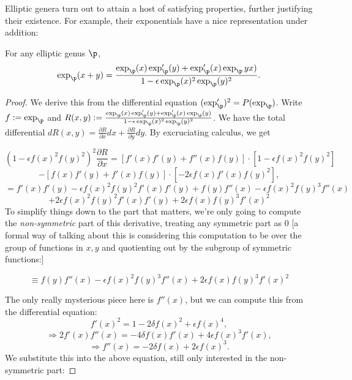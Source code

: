 Elliptic genera turn out to attain a host of satisfying properties, further justifying their existence. For example, their exponentials have a nice representation under addition:

\begin{proposition}
    For any elliptic genus $\p$,
    \[\exp_\p(x + y) = \frac{\exp_\p (x) \exp_\p' (y) + \exp_\p' (x) \exp_\p yx)    }{1 - \epsilon \exp_\p (x)^2 \exp_\p (y)^2  }.\]
\end{proposition}

\begin{proof}
    We derive this from the differential equation $(\exp_\p ')^2 = P(\exp_\p)$. Write $f:=\exp_\p $ and $R(x, y):= \frac{\exp_\p (x) \exp_\p' (y) + \exp_\p' (x) \exp_\p (y)    }{1 - \epsilon \exp_\p (x)^2 \exp_\p (y)^2  }$. We have the total differential $dR(x, y) = \frac{\partial R}{\partial x} dx + \frac{\partial R}{\partial y} dy$. By excruciating calculus, we get

\[(1 - \epsilon f(x)^2 f(y)^2)^2 \frac{\partial R}{\partial x} = [f'(x) f'(y) + f''(x) f(y)] \cdot [1 - \epsilon f(x)^2 f(y)^2]\]
\[ - [f(x) f'(y) + f'(x) f(y) ] \cdot [-2 \epsilon f(x) f'(x) f(y)^2],\]
\[ = f'(x) f'(y) - \epsilon f(x)^2 f(y)^2 f'(x) f'(y) + f(y)  f''(x) - \epsilon f(x)^2 f(y)^3 f''(x)\]
\[ + 2 \epsilon f(x)^2 f(y)^2 f'(x) f'(y) + 2 \epsilon f(x) f(y)^3 f'(x)^2 \]
To simplify things down to the part that matters, we're only going to compute the \textit{non-symmetric} part of this derivative, treating any symmetric part as $0$ [a formal way of talking about this is considering this computation to be over the group of functions in $x, y$ and quotienting out by the subgroup of symmetric functions:]

\[ \equiv f(y)  f''(x) - \epsilon f(x)^2 f(y)^3 f''(x)   + 2 \epsilon f(x) f(y)^3 f'(x)^2 \]


    The only really mysterious piece here is $f''(x)$, but we can compute this from the differential equation:
    \[f'(x)^2 = 1 -2 \delta f(x)^2 + \epsilon f(x)^4,\]
\[\Rightarrow 2 f'(x) f''(x) = -4 \delta f(x) f'(x) + 4 \epsilon f(x)^3 f'(x),\]
\[\Rightarrow f''(x) = -2 \delta f(x) + 2 \epsilon f(x)^3.\]
We substitute this into the above equation, still only interested in the non-symmetric part:


\end{proof}
